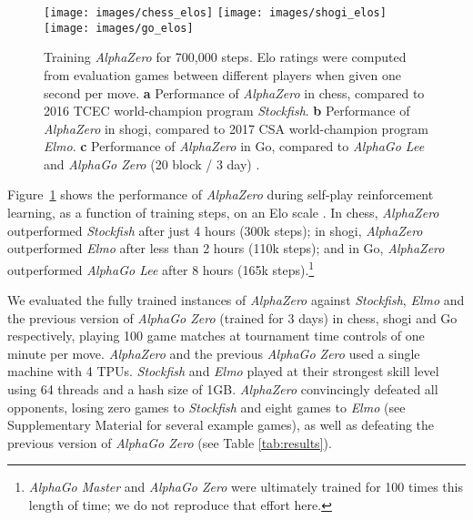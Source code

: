 \documentclass[12pt]{article}
\begin{document}
\begin{figure}
\texttt{[image: images/chess\_elos]}
\texttt{[image: images/shogi\_elos]}
\texttt{[image: images/go\_elos]}
\caption{
\label{fig:training}
Training \emph{AlphaZero} for 700,000 steps. Elo ratings were computed from evaluation games between different players when given one second per move. 
\textbf{a} Performance of \emph{AlphaZero} in chess, compared to 2016 TCEC world-champion program \emph{Stockfish}.
\textbf{b} Performance of \emph{AlphaZero} in shogi, compared to 2017 CSA world-champion program \emph{Elmo}.
\textbf{c} Performance of \emph{AlphaZero} in Go, compared to \emph{AlphaGo Lee} 
and \emph{AlphaGo Zero} (20 block / 3 day) \cite{Silver17AG0}. 
}
\end{figure}

Figure~\ref{fig:training} shows the performance of \emph{AlphaZero} during self-play reinforcement learning, as a function of training steps, on an Elo scale \cite{coulom:bayeselo}. In chess, \emph{AlphaZero} outperformed \emph{Stockfish} after just 4 hours (300k steps); in shogi, \emph{AlphaZero} outperformed \emph{Elmo} after less than 2 hours (110k steps); and in Go, \emph{AlphaZero} outperformed \emph{AlphaGo Lee} \cite{Silver17AG0} after 8 hours (165k steps).\footnote{\emph{AlphaGo Master} and \emph{AlphaGo Zero} were ultimately trained for 100 times this length of time; we do not reproduce that effort here.}

We evaluated the fully trained instances of \emph{AlphaZero} against \emph{Stockfish}, \emph{Elmo} and the previous version of \emph{AlphaGo Zero} (trained for 3 days) in chess, shogi and Go respectively, playing 100 game matches at tournament time controls of one minute per move. \emph{AlphaZero} and the previous \emph{AlphaGo Zero} used a single machine with 4 TPUs. \emph{Stockfish} and \emph{Elmo} played at their strongest skill level using 64 threads and a hash size of 1GB. \emph{AlphaZero} convincingly defeated all opponents, losing zero games to \emph{Stockfish}
and eight games to \emph{Elmo} (see Supplementary Material for several example games), as well as defeating the previous version of \emph{AlphaGo Zero} (see Table \ref{tab:results}).
\end{document}
